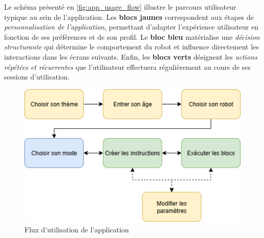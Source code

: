 Le schéma présenté en \autoref{fig:app_usage_flow} illustre le parcours utilisateur typique au sein de l’application. 
Les \textbf{blocs jaunes} correspondent aux étapes de \textit{personnalisation de l'application}, permettant d'adapter l'expérience utilisateur en fonction de ses préférences et de son profil.
Le \textbf{bloc bleu} matérialise une \textit{décision structurante} qui détermine le comportement du robot et influence directement les interactions dans les écrans suivants.
Enfin, les \textbf{blocs verts} désignent les \textit{actions répétées et récurrentes} que l’utilisateur effectuera régulièrement au cours de ses sessions d'utilisation.

\begin{figure}[H]
    \centering
    \includegraphics[width=0.75\linewidth]{.//figures//flow.png}
    \caption{\label{fig:app_usage_flow} Flux d'utilisation de l'application}
\end{figure}

